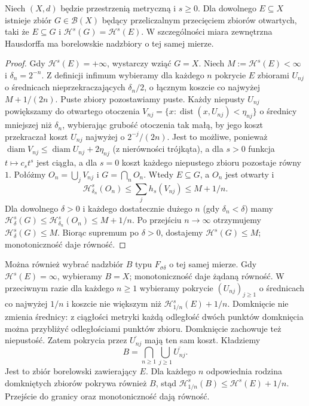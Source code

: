 \begin{twierdzenie}
\label{thm:hausdorff-gdelta-26}\label{it:thm:hausdorff-borel-hull-zero}
Niech $(X,d)$ będzie przestrzenią metryczną i $s\ge0$.
Dla dowolnego $E\subseteq X$ istnieje zbiór
$G\in\mathcal B(X)$ będący przeliczalnym
przecięciem zbiorów otwartych, taki że
$E\subseteq G$ i $\mathcal H^s(G)=\mathcal H^s(E)$.
W szczególności miara zewnętrzna Hausdorffa ma
borelowskie nadzbiory o tej samej mierze.
\end{twierdzenie}
\begin{proof}
Gdy $\mathcal H^s(E)=+\infty$, wystarczy wziąć $G=X$.
Niech $M:=\mathcal H^s(E)<\infty$ i $\delta_n=2^{-n}$.
Z definicji infimum wybieramy dla każdego $n$
pokrycie $E$ zbiorami $U_{nj}$ o średnicach
nieprzekraczających $\delta_n/2$, o łącznym
koszcie co najwyżej $M+1/(2n)$.
Puste zbiory pozostawiamy puste. Każdy niepusty
$U_{nj}$ powiększamy do otwartego otoczenia
$V_{nj}=\{x:\operatorname{dist}(x,U_{nj})<\eta_{nj}\}$
o średnicy
mniejszej niż $\delta_n$, wybierając grubość
otoczenia tak małą, by jego koszt przekraczał
koszt $U_{nj}$ najwyżej o $2^{-j}/(2n)$.
Jest to możliwe, ponieważ
$\operatorname{diam}V_{nj}\le\operatorname{diam}U_{nj}+2\eta_{nj}$
(z nierówności trójkąta), a dla $s>0$ funkcja
$t\mapsto c_st^s$ jest ciągła, a dla $s=0$
koszt każdego niepustego zbioru pozostaje równy $1$.
Połóżmy $O_n=\bigcup_jV_{nj}$ i $G=\bigcap_nO_n$.
Wtedy $E\subseteq G$, a $O_n$ jest otwarty i
\[
 \mathcal H^s_{\delta_n}(O_n)
 \leq\sum_jh_s(V_{nj})\leq M+1/n.
\]
Dla dowolnego $\delta>0$ i każdego dostatecznie
dużego $n$ (gdy $\delta_n<\delta$) mamy
$\mathcal H^s_\delta(G)\leq
\mathcal H^s_{\delta_n}(O_n)\leq M+1/n$.
Po przejściu $n\to\infty$ otrzymujemy
$\mathcal H^s_\delta(G)\leq M$.
Biorąc supremum po $\delta>0$,
dostajemy $\mathcal H^s(G)\leq M$;
monotoniczność daje równość.
\end{proof}

\begin{uwaga}
Można również wybrać nadzbiór $B$ typu $F_{\sigma\delta}$ o tej samej mierze.
Gdy $\mathcal H^s(E)=\infty$, wybieramy $B=X$;
monotoniczność daje żądaną równość. W przeciwnym
razie dla każdego $n\ge1$ wybieramy pokrycie $(U_{nj})_{j\ge1}$
o średnicach co najwyżej $1/n$ i koszcie nie większym
niż $\mathcal H^s_{1/n}(E)+1/n$.
Domknięcie nie zmienia średnicy: z ciągłości metryki
każdą odległość dwóch punktów domknięcia można
przybliżyć odległościami punktów zbioru.
Domknięcie zachowuje też niepustość.
Zatem pokrycia przez $\overline{U_{nj}}$ mają ten sam koszt.
Kładziemy
\[
 B=\bigcap_{n\ge1}\bigcup_{j\ge1}\overline{U_{nj}}.
\]
Jest to zbiór borelowski zawierający $E$.
Dla każdego $n$ odpowiednia rodzina domkniętych zbiorów
pokrywa również $B$, stąd
$\mathcal H^s_{1/n}(B)\le\mathcal H^s(E)+1/n$.
Przejście do granicy oraz monotoniczność dają równość.
\end{uwaga}

